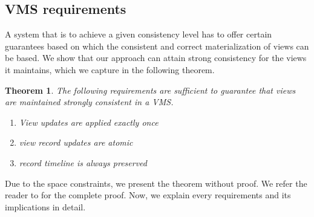 

\subsection{VMS requirements} 
\label{subsec:vms_requirements} 

A system that is to achieve a given consistency level has to offer
certain guarantees based on which the consistent and correct
materialization of views can be based.  We show that our approach can
attain strong consistency for the views it maintains, which we capture
in the following theorem.\\


\newtheorem{theorem}{Theorem}
\begin{theorem}
\label{theo:strong_consistency}
The following requirements are sufficient to guarantee that views are
maintained \textit{strongly} consistent in a VMS.

\begin{enumerate}
	\item  View updates are applied \textit{exactly once}
	\item  view record updates are \textit{atomic}
	\item  record \textit{timeline} is always preserved
\end{enumerate}
\end{theorem}
\hfill \newline
Due to the space constraints, we present the theorem without proof.
We refer the reader to \cite{extended:version} for the complete proof. 
Now, we explain every requirements and its implications in detail. 


